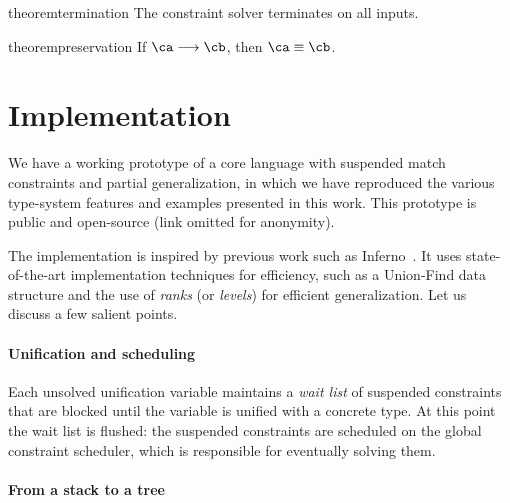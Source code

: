 \documentclass[acmsmall,screen,nonacm,review]{acmart}
\begin{document}
\begin{restatable}[Termination]{theorem}{termination}
  The constraint solver terminates on all inputs.
\end{restatable}

\begin{restatable}[Preservation]{theorem}{preservation}
  If $\ca \csolve \cb$, then $\ca \cequiv \cb$.
\end{restatable}

\section{Implementation}
\label{sec:implementation}

We have a working prototype of a core \ML language with suspended
match constraints and partial generalization, in which we have
reproduced the various type-system features and examples presented in
this work. This prototype is public and open-source (link omitted for anonymity).

The implementation is inspired by previous work such as
Inferno~\citet*{inferno}. It uses state-of-the-art implementation
techniques for efficiency, such as a Union-Find data structure and the
use of \emph{ranks} (or \emph{levels}) for efficient
generalization. Let us discuss a few salient points.

\paragraph{Unification and scheduling} Each unsolved unification
variable maintains a \emph{wait list} of suspended constraints that
are blocked until the variable is unified with a concrete type. At
this point the wait list is flushed: the suspended constraints are
scheduled on the global constraint scheduler, which is responsible for
eventually solving them.

\paragraph{From a stack to a tree}
\end{document}
